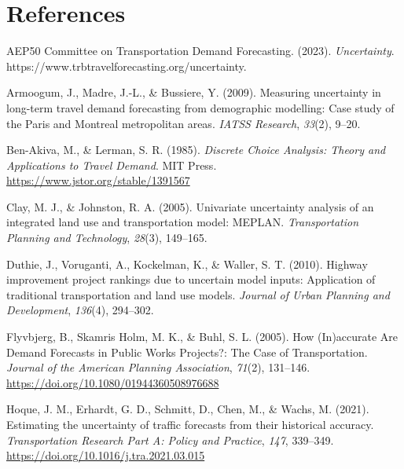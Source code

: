\documentclass[
  letterpaper,
  number,
  review,
  3p]{elsarticle}
\newlength{\cslhangindent}
\newenvironment{CSLReferences}[2] %
 {\begin{list}{}{%
  \setlength{\itemindent}{0pt}
  \setlength{\leftmargin}{0pt}
  \setlength{\parsep}{0pt}
  \ifodd #1
   \setlength{\leftmargin}{\cslhangindent}
   \setlength{\itemindent}{-1\cslhangindent}
  \fi
  \setlength{\itemsep}{#2\baselineskip}}}
 {\end{list}}
\begin{document}

\section*{References}\label{references}


\label{refs}
\begin{CSLReferences}{1}{0}
AEP50 Committee on Transportation Demand Forecasting. (2023).
\emph{Uncertainty}. https://www.trbtravelforecasting.org/uncertainty.

Armoogum, J., Madre, J.-L., \& Bussiere, Y. (2009). Measuring
uncertainty in long-term travel demand forecasting from demographic
modelling: {Case} study of the {Paris} and {Montreal} metropolitan
areas. \emph{IATSS Research}, \emph{33}(2), 9--20.

Ben-Akiva, M., \& Lerman, S. R. (1985). \emph{Discrete {Choice
Analysis}: {Theory} and {Applications} to {Travel Demand}}. MIT Press.
\url{https://www.jstor.org/stable/1391567}

Clay, M. J., \& Johnston, R. A. (2005). Univariate uncertainty analysis
of an integrated land use and transportation model: {MEPLAN}.
\emph{Transportation Planning and Technology}, \emph{28}(3), 149--165.

Duthie, J., Voruganti, A., Kockelman, K., \& Waller, S. T. (2010).
Highway improvement project rankings due to uncertain model inputs:
{Application} of traditional transportation and land use models.
\emph{Journal of Urban Planning and Development}, \emph{136}(4),
294--302.

Flyvbjerg, B., Skamris Holm, M. K., \& Buhl, S. L. (2005). How
({In})accurate {Are Demand Forecasts} in {Public Works Projects}?: {The
Case} of {Transportation}. \emph{Journal of the American Planning
Association}, \emph{71}(2), 131--146.
\url{https://doi.org/10.1080/01944360508976688}

Hoque, J. M., Erhardt, G. D., Schmitt, D., Chen, M., \& Wachs, M.
(2021). Estimating the uncertainty of traffic forecasts from their
historical accuracy. \emph{Transportation Research Part A: Policy and
Practice}, \emph{147}, 339--349.
\url{https://doi.org/10.1016/j.tra.2021.03.015}


\end{CSLReferences}
\end{document}
